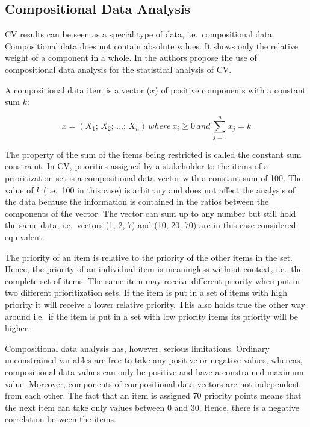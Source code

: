 
\subsection{\label{coda}Compositional Data Analysis}
CV results can be seen as a special type of data, i.e.\ compositional data.
Compositional data does not contain absolute values. It shows only
the relative weight of a component in a whole. In \citep{Chatzipetrou2010} the authors
propose the use of compositional data analysis for the statistical analysis of CV. 

A compositional data item is a vector ($x$) of positive components with a constant sum $k$:

\begin{equation}
x=(X_{1};\, X_{2};\,\ldots;\, X_{n})\, where\, x_{i}\geq0\, and\,\sum_{j=1}^{n}x_{j}=k
\label{eq:compositional-data}
\end{equation}

The property of the sum of the items being restricted is called the constant
sum constraint. In CV, priorities assigned by a stakeholder to the items of a prioritization
set is a compositional data vector with a constant sum of 100.
The value of $k$ (i.e.\ 100 in this case) is arbitrary and does not affect the analysis 
of the data because the information is contained in the ratios between the components of 
the vector. The vector can sum up to any number but still hold the same data, i.e.\ vectors 
(1, 2, 7) and (10, 20, 70) are in this case considered equivalent.

The priority of an item is relative to the priority of the other items
in the set. Hence, the priority of an individual item is meaningless without
context, i.e.\ the complete set of items. The same item may receive different priority
when put in two different prioritization sets. If the item is put
in a set of items with high priority it will receive a lower relative
priority. This also holds true the other way around i.e.\ if the item is put in a set
with low priority items its priority will be higher.

Compositional data analysis has, however, serious limitations.
Ordinary unconstrained variables are free to take any positive or negative
values, whereas, compositional data values can only be positive and
have a constrained maximum value. Moreover, components of compositional
data vectors are not independent from each other. The fact that an
item is assigned 70 priority points means that the next item can take
only values between 0 and 30. Hence, there is a negative correlation
between the items.

